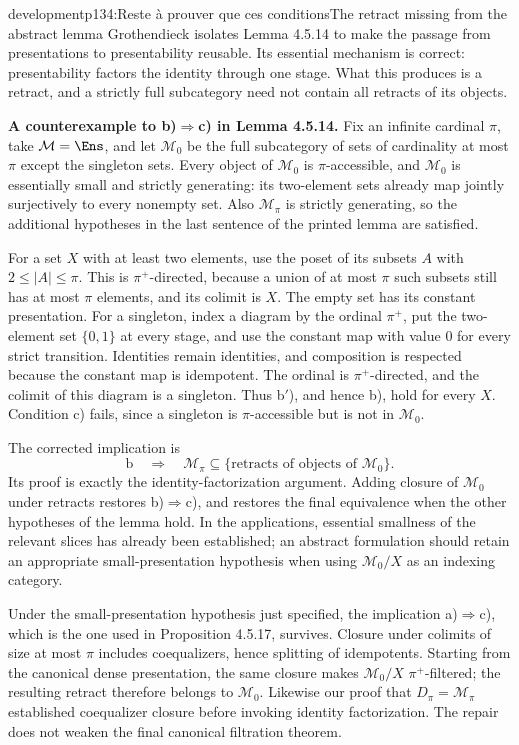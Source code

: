 \begin{dcomment}{development}{p134:Reste à prouver que ces conditions}{The retract missing from the abstract lemma}
Grothendieck isolates Lemma 4.5.14 to make the passage from presentations to presentability reusable. Its essential mechanism is correct: presentability factors the identity through one stage. What this produces is a retract, and a strictly full subcategory need not contain all retracts of its objects.

\textbf{A counterexample to b)$\Rightarrow$c) in Lemma 4.5.14.}\ours{}
Fix an infinite cardinal $\pi$, take $\mathcal M=\Ens$, and let $\mathcal M_0$ be the full subcategory of sets of cardinality at most $\pi$ except the singleton sets. Every object of $\mathcal M_0$ is $\pi$-accessible, and $\mathcal M_0$ is essentially small and strictly generating: its two-element sets already map jointly surjectively to every nonempty set. Also $\mathcal M_\pi$ is strictly generating, so the additional hypotheses in the last sentence of the printed lemma are satisfied.

For a set $X$ with at least two elements, use the poset of its subsets $A$ with $2\leq|A|\leq\pi$. This is $\pi^+$-directed, because a union of at most $\pi$ such subsets still has at most $\pi$ elements, and its colimit is $X$. The empty set has its constant presentation. For a singleton, index a diagram by the ordinal $\pi^+$, put the two-element set $\{0,1\}$ at every stage, and use the constant map with value $0$ for every strict transition. Identities remain identities, and composition is respected because the constant map is idempotent. The ordinal is $\pi^+$-directed, and the colimit of this diagram is a singleton. Thus b$'$), and hence b), hold for every $X$. Condition c) fails, since a singleton is $\pi$-accessible but is not in $\mathcal M_0$.

The corrected implication is
\[
 \mathrm{b}\quad\Longrightarrow\quad
 \mathcal M_\pi\subseteq
 \{\text{retracts of objects of }\mathcal M_0\}.
\]
Its proof is exactly the identity-factorization argument. Adding closure of $\mathcal M_0$ under retracts restores b)$\Rightarrow$c), and restores the final equivalence when the other hypotheses of the lemma hold. In the applications, essential smallness of the relevant slices has already been established; an abstract formulation should retain an appropriate small-presentation hypothesis when using $\mathcal M_0/X$ as an indexing category.

Under the small-presentation hypothesis just specified, the implication a)$\Rightarrow$c), which is the one used in Proposition 4.5.17, survives. Closure under colimits of size at most $\pi$ includes coequalizers, hence splitting of idempotents. Starting from the canonical dense presentation, the same closure makes $\mathcal M_0/X$ $\pi^+$-filtered; the resulting retract therefore belongs to $\mathcal M_0$. Likewise our proof that $D_\pi=\mathcal M_\pi$ established coequalizer closure before invoking identity factorization. The repair does not weaken the final canonical filtration theorem.
\end{dcomment}

